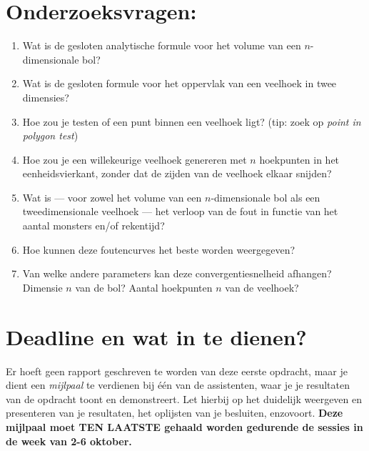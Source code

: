 \documentclass[10pt,a4paper]{article}
\begin{document}
\section*{Onderzoeksvragen:}

\begin{enumerate}
	\item Wat is de gesloten analytische formule voor het volume van een $n$-dimensionale bol?
	\item Wat is de gesloten formule voor het oppervlak van een veelhoek in twee dimensies?
	\item Hoe zou je testen of een punt binnen een veelhoek ligt? (tip: zoek op \emph{point in polygon test})
	\item Hoe zou je een willekeurige veelhoek genereren met $n$ hoekpunten in het eenheidsvierkant, zonder dat de zijden van de veelhoek elkaar snijden?
	\item Wat is --- voor zowel het volume van een $n$-dimensionale bol als een tweedimensionale veelhoek --- het verloop van de fout in functie van het aantal monsters en/of rekentijd?
	\item Hoe kunnen deze foutencurves het beste worden weergegeven?
	\item Van welke andere parameters kan deze convergentiesnelheid afhangen? Dimensie $n$ van de bol? Aantal hoekpunten $n$ van de veelhoek?
\end{enumerate}

\section*{Deadline en wat in te dienen?}

Er hoeft geen rapport geschreven te worden van deze eerste opdracht, maar je dient een \emph{mijlpaal} te verdienen bij \'e\'en van de assistenten, waar je je resultaten van de opdracht toont en demonstreert. Let hierbij op het duidelijk weergeven en presenteren van je resultaten, het oplijsten van je besluiten, enzovoort. 
\textbf{Deze mijlpaal moet TEN LAATSTE gehaald worden gedurende de sessies in de week van 2-6 oktober.}
\end{document}

